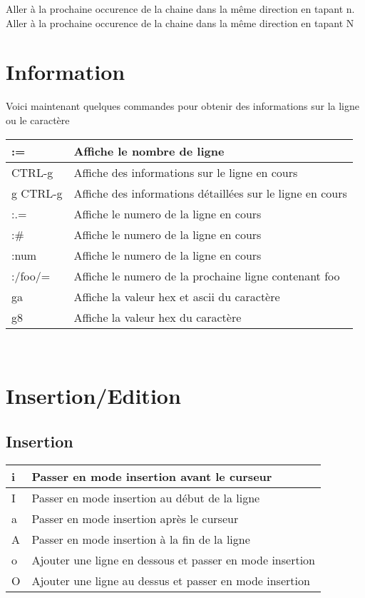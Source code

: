 \documentclass{article}
\begin{document}
\noindent
Aller à la prochaine occurence de la chaine dans la même direction en tapant n.\\
Aller à la prochaine occurence de la chaine dans la même direction en tapant N

\section{Information}
Voici maintenant quelques commandes pour obtenir des informations sur la ligne ou le caractère\\


\begin{tabular}{|p{3cm}| l| }
\hline
:= & Affiche le nombre de ligne\\ \hline
CTRL-g & Affiche des informations sur le ligne en cours\\ \hline
g CTRL-g & Affiche des informations détaillées sur le ligne en cours\\ \hline
:.= & Affiche le numero de la ligne en cours\\ \hline
:\# & Affiche le numero de la ligne en cours\\ \hline
:num & Affiche le numero de la ligne en cours\\ \hline
:/foo/= & Affiche le numero de la prochaine ligne contenant foo\\ \hline
ga & Affiche la valeur hex et ascii du caractère\\ \hline
g8 & Affiche la valeur hex du caractère\\ \hline
\end{tabular}\\

\section{Insertion/Edition}
\subsection{Insertion}
\begin{tabular}{|p{3cm}| l| }
\hline
i & Passer en mode insertion avant le curseur\\ \hline
I & Passer en mode insertion au début de la ligne\\ \hline
a & Passer en mode insertion après le curseur\\ \hline
A & Passer en mode insertion à la fin de la ligne\\ \hline
o & Ajouter une ligne en dessous et passer en mode insertion \\ \hline
O & Ajouter une ligne au dessus et passer en mode insertion \\ \hline
\end{tabular}\\
\end{document}
